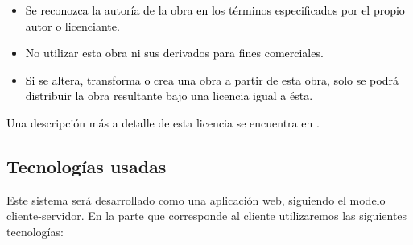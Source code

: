 \documentclass[11pt,letterpaper,titlepage]{article}
\begin{document}
\begin{itemize}
 \item \textcolor{black}{Se reconozca la autor\'ia de la obra en los t\'erminos especificados por el propio autor o licenciante.}
 \item \textcolor{black}{No utilizar esta obra ni sus derivados para fines comerciales.}
 \item \textcolor{black}{Si se altera, transforma o crea una obra a partir de esta obra, solo se podr\'a distribuir la obra resultante bajo una licencia igual a \'esta.}
\end{itemize}

 \textcolor{black}{Una descripci\'on m\'as a detalle de esta licencia se encuentra en \cite{creativecommons}.}
 



\subsection{Tecnolog\'ias usadas}
Este sistema ser\'a desarrollado como una aplicaci\'on web, siguiendo el modelo cliente-servidor. En la parte que corresponde al cliente utilizaremos las siguientes tecnolog\'ias:
\end{document}
